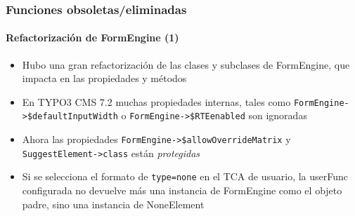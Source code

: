 \begin{frame}[fragile]
	\frametitle{Funciones obsoletas/eliminadas}
	\framesubtitle{Refactorización de FormEngine (1)}

	\begin{itemize}

		\item Hubo una gran refactorización de las clases y subclases de FormEngine, 
			que impacta en las propiedades y métodos

		\item En TYPO3 CMS 7.2 muchas propiedades internas, tales como
			\small\texttt{FormEngine->\$defaultInputWidth}\normalsize\space
			o
			\small\texttt{FormEngine->\$RTEenabled}\normalsize\space\newline
			son ignoradas

		\item Ahora las propiedades 
			\small\texttt{FormEngine->\$allowOverrideMatrix}\normalsize\space
			y
			\small\texttt{SuggestElement->class}\normalsize\space
			 están \textit{protegidas}

		\item Si se selecciona el formato de \texttt{type=none} en el TCA de usuario, la userFunc configurada no devuelve más una instancia de FormEngine como el objeto padre, sino una instancia de NoneElement

	\end{itemize}

\end{frame}


